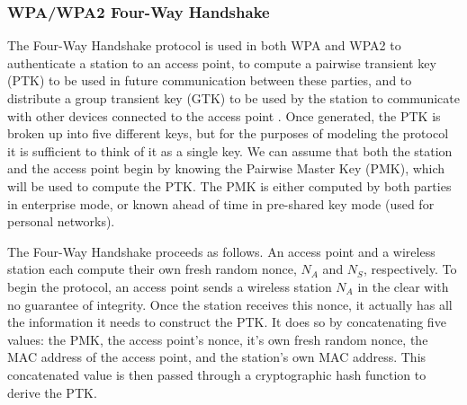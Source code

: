 \documentclass[11pt, twocolumn]{article} %
\begin{document}
{%

\subsubsection{WPA/WPA2 Four-Way Handshake}
\label{sec:WPA Dec}
The Four-Way Handshake protocol is used in both WPA and WPA2 to authenticate a station to an access point, to compute a pairwise transient key (PTK) to be used in future communication between these parties, and to distribute a group transient key (GTK) to be used by the station to communicate with other devices connected to the access point \cite{liu08}.  Once generated, the PTK is broken up into five different keys, but for the purposes of modeling the protocol it is sufficient to think of it as a single key.  We can assume that both the station and the access point begin by knowing the Pairwise Master Key (PMK), which will be used to compute the PTK.  The PMK is either computed by both parties in enterprise mode, or known ahead of time in pre-shared key mode (used for personal networks).

The Four-Way Handshake proceeds as follows.  An access point and a wireless station each compute their own fresh random nonce, $N_A$ and $N_S$, respectively.  To begin the protocol, an access point sends a wireless station $N_A$ in the clear with no guarantee of integrity.  Once the station receives this nonce, it actually has all the information it needs to construct the PTK.  It does so by concatenating five values: the PMK, the access point's nonce, it's own fresh random nonce, the MAC address of the access point, and the station's own MAC address.  This concatenated value is then passed through a cryptographic hash function to derive the PTK.  

}
\end{document}
